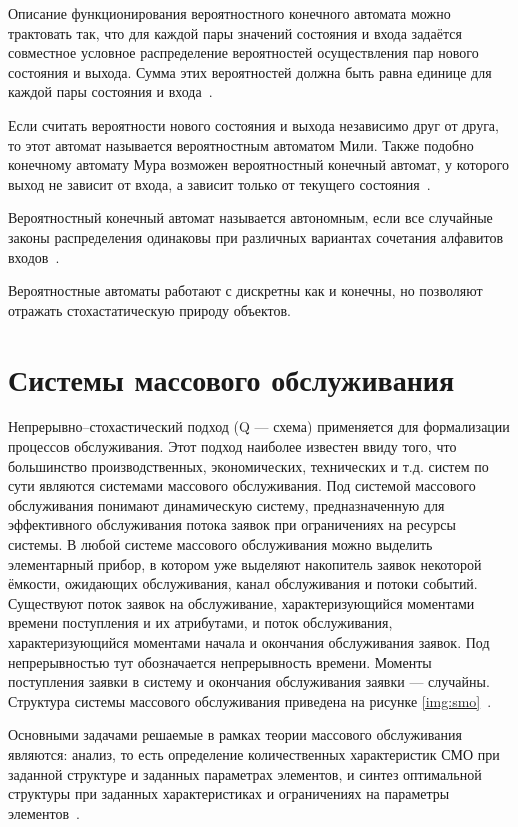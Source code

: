 Описание функционирования вероятностного конечного автомата можно трактовать так, что для каждой пары значений состояния и входа задаётся совместное условное распределение вероятностей осуществления пар нового состояния и выхода. Сумма этих вероятностей должна быть равна единице для каждой пары состояния и входа~\cite{va}.

Если считать вероятности нового состояния и выхода независимо друг от друга, то этот автомат называется вероятностным автоматом Мили. Также подобно конечному автомату Мура возможен вероятностный конечный автомат, у которого выход не зависит от входа, а зависит только от текущего состояния~\cite{va}.

Вероятностный конечный автомат называется автономным, если все случайные законы распределения одинаковы при различных вариантах сочетания алфавитов входов~\cite{va}.

Вероятностные автоматы работают с дискретны как и конечны, но позволяют отражать стохастатическую природу объектов.

\section{Системы массового обслуживания}

Непрерывно--стохастический подход (Q --- схема) применяется для формализации процессов обслуживания.  Этот подход наиболее известен ввиду того, что большинство производственных, экономических, технических и т.д. систем по сути являются системами массового обслуживания. Под системой массового обслуживания понимают динамическую систему, предназначенную для эффективного обслуживания потока заявок  при ограничениях на ресурсы системы. В любой системе массового обслуживания можно выделить элементарный прибор, в котором уже выделяют накопитель заявок некоторой ёмкости, ожидающих обслуживания, канал обслуживания и потоки событий. Существуют поток заявок на обслуживание, характеризующийся моментами времени поступления и их атрибутами, и поток обслуживания, характеризующийся моментами начала и окончания обслуживания заявок. Под непрерывностью тут обозначается непрерывность времени. Моменты поступления заявки в систему и окончания обслуживания заявки --- случайны. Структура системы массового обслуживания приведена на рисунке \ref{img:smo}~\cite{sheme_types}.

\FloatBarrier

Основными задачами решаемые в рамках теории массового обслуживания являются: анализ, то есть определение количественных характеристик СМО при заданной структуре и заданных параметрах элементов, и синтез оптимальной структуры при заданных характеристиках и ограничениях на параметры элементов~\cite{ak_det}.

